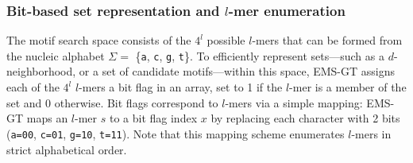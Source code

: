 \documentclass[oneside,12pt]{DISCSthesis}
\begin{document}
		\subsubsection{Bit-based set representation and $l$-mer enumeration}
			The motif search space consists of the $4^{l}$ possible $l$-mers that can be formed from the nucleic alphabet $\Sigma=$ \{\texttt{a}, \texttt{c}, \texttt{g}, \texttt{t}\}. To efficiently represent sets---such as a $d$-neighborhood, or a set of candidate motifs---within this space, EMS-GT assigns each of the $4^{l}$ $l$-mers a bit flag in an array, set to 1 if the $l$-mer is a member of the set and 0 otherwise. Bit flags correspond to $l$-mers via a simple mapping: EMS-GT maps an $l$-mer $s$ to a bit flag index $x$ by replacing each character with 2 bits (\texttt{a=00}, \texttt{c=01}, \texttt{g=10}, \texttt{t=11}). Note that this mapping scheme enumerates $l$-mers in strict alphabetical order.
\end{document}
